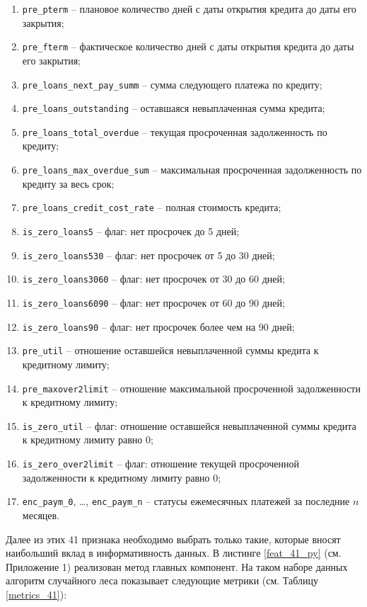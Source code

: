 \begin{enumerate}[nosep]
    \item \texttt{pre\_pterm} -- плановое количество дней с даты открытия кредита до даты его закрытия;
    \item \texttt{pre\_fterm} -- фактическое количество дней с даты открытия кредита до даты его закрытия;
    \item \texttt{pre\_loans\_next\_pay\_summ} -- сумма следующего платежа по кредиту;
    \item \texttt{pre\_loans\_outstanding} -- оставшаяся невыплаченная сумма кредита;
    \item \texttt{pre\_loans\_total\_overdue} -- текущая просроченная задолженность по кредиту;
    \item \texttt{pre\_loans\_max\_overdue\_sum} -- максимальная просроченная задолженность по кредиту за весь срок;
    \item \texttt{pre\_loans\_credit\_cost\_rate} -- полная стоимость кредита;
    \item \texttt{is\_zero\_loans5} -- флаг: нет просрочек до 5 дней;
    \item \texttt{is\_zero\_loans530} -- флаг: нет просрочек от 5 до 30 дней;
    \item \texttt{is\_zero\_loans3060} -- флаг: нет просрочек от 30 до 60 дней;
    \item \texttt{is\_zero\_loans6090} -- флаг: нет просрочек от 60 до 90 дней;
    \item \texttt{is\_zero\_loans90} -- флаг: нет просрочек более чем на 90 дней;
    \item \texttt{pre\_util} -- отношение оставшейся невыплаченной суммы кредита к кредитному лимиту;
    \item \texttt{pre\_maxover2limit} -- отношение максимальной просроченной задолженности к кредитному лимиту;
    \item \texttt{is\_zero\_util} – флаг: отношение оставшейся невыплаченной суммы кредита к кредитному лимиту равно 0;
    \item \texttt{is\_zero\_over2limit} -- флаг: отношение текущей просроченной задолженности к кредитному лимиту равно 0;
   \item \texttt{enc\_paym\_0}, \dots, \texttt{enc\_paym\_n} -- статусы ежемесячных платежей за последние $n$ месяцев.
\end{enumerate}

Далее из этих 41 признака необходимо выбрать только такие, которые вносят наибольший вклад в информативность данных. В листинге  \ref{feat_41_py} (см. Приложение 1) реализован метод главных компонент. На таком наборе данных алгоритм случайного леса показывает следующие метрики (см. Таблицу \ref{metrics_41}):

